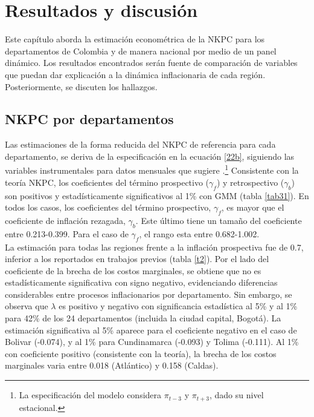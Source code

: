 \chapter{Resultados y discusión} \label{cap3}
Este capítulo aborda la estimación econométrica de la NKPC para los departamentos de Colombia y de manera nacional por medio de un panel dinámico. Los resultados encontrados serán fuente de comparación de variables que puedan dar explicación a la dinámica inflacionaria de cada región. Posteriormente, se discuten los hallazgos.

\section{NKPC por departamentos}
Las estimaciones de la forma reducida del NKPC de referencia para cada departamento, se deriva de la especificación en la ecuación \eqref{22b}, siguiendo las variables instrumentales para datos mensuales  que sugiere \cite{ramos2008inflation}.\footnote{La especificación del modelo considera $\pi_{t-3}$ y $\pi_{t+3}$, dado su nivel estacional.}  Consistente con la teoría NKPC, los coeficientes del término prospectivo ($\gamma_{f}$)  y retrospectivo  ($\gamma_{b}$)  son positivos y estadísticamente significativos al 1\% con GMM (tabla \ref{tab31}). En todos los casos, los coeficientes del término prospectivo, $\gamma_{f}$, es mayor que el coeficiente de inflación rezagada, $\gamma_{b}$. Este último tiene un tamaño del coeficiente entre  0.213-0.399. Para el caso de $\gamma_{f}$, el rango esta entre  0.682-1.002.\\

La estimación para todas las regiones frente a la inflación prospectiva fue de 0.7, inferior a los reportados en trabajos previos (tabla \ref{t2}). Por el lado del coeficiente de la brecha de los costos marginales, se obtiene que no es estadísticamente significativa con signo negativo, evidenciando  diferencias considerables entre procesos inflacionarios por departamento. Sin embargo, se observa que $\lambda$ es positivo y negativo con significancia estadística al 5\% y al 1\% para 42\% de los 24 departamentos (incluida la ciudad capital, Bogotá). La estimación significativa al 5\% aparece para el coeficiente negativo en el caso de Bolivar (-0.074), y al 1\% para Cundinamarca (-0.093) y Tolima (-0.111).  Al 1\%  con coeficiente positivo (consistente con la teoría), la brecha de los costos marginales varia entre 0.018 (Atlántico) y 0.158 (Caldas).

